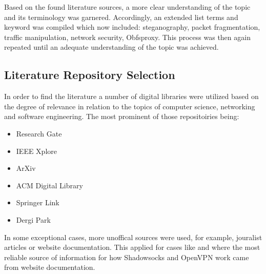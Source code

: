 \documentclass[12pt, fleqn, a4paper]{article}
\begin{document}
Based on the found literature sources, a more clear understanding of the topic and its terminology was garnered. Accordingly, an extended list terms and keyword was compiled which now included: steganography, packet fragmentation, traffic manipulation, network security, Obfsproxy. 
This process was then again repeated until an adequate understanding of the topic was achieved.

\subsection{Literature Repository Selection}
In order to find the literature a number of digital libraries were utilized based on the degree of relevance in relation to the topics of computer science, networking and software engineering. The most prominent of those repositoiries being:
\begin{itemize}
  \item Research Gate
  \item IEEE Xplore
  \item ArXiv
  \item ACM Digital Library
  \item Springer Link
  \item Dergi Park
\end{itemize}
In some exceptional cases, more unoffical sources were used, for example, jouralist articles or website documentation. This applied for cases like \cite{Shadowsocks} and \cite{openvpn2} where the most reliable source of information for how Shadowsocks and OpenVPN work came from website documentation.
\end{document}
